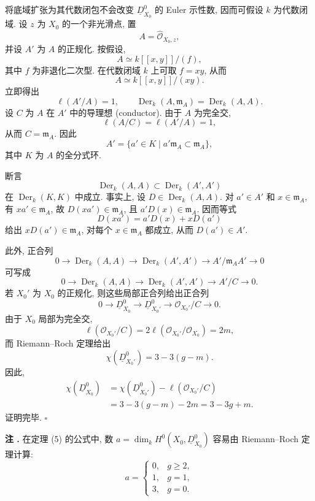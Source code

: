 将底域扩张为其代数闭包不会改变 $\underline D^0_{X_0}$ 的 Euler 示性数, 因而可假设 $k$ 为代数闭域. 设 $z$ 为 $X_0$ 的一个非光滑点, 置
\[
A=\widehat{\mathcal O}_{X_0,z},
\]
并设 $A'$ 为 $A$ 的正规化. 按假设,
\[
A\simeq k[[x,y]]/(f),
\]
其中 $f$ 为非退化二次型. 在代数闭域 $k$ 上可取 $f=xy$, 从而
\[
A\simeq k[[x,y]]/(xy).
\]
立即得出
\[
\ell(A'/A)=1,
\qquad
\operatorname{Der}_k(A,\mathfrak m_A)
=\operatorname{Der}_k(A,A).
\]
设 $C$ 为 $A$ 在 $A'$ 中的导理想 (conductor). 由于 $A$ 为完全交,
\[
\ell(A/C)=\ell(A'/A)=1,
\]
从而 $C=\mathfrak m_A$. 因此
\[
A'=\{a'\in K\mid a'\mathfrak m_A\subset\mathfrak m_A\},
\]
其中 $K$ 为 $A$ 的全分式环.

断言
\[
\operatorname{Der}_k(A,A)
 \subset\operatorname{Der}_k(A',A')
\]
在 $\operatorname{Der}_k(K,K)$ 中成立. 事实上, 设 $D\in\operatorname{Der}_k(A,A)$. 对 $a'\in A'$ 和 $x\in\mathfrak m_A$, 有 $xa'\in\mathfrak m_A$, 故 $D(xa')\in\mathfrak m_A$, 且 $a'D(x)\in\mathfrak m_A$. 因而等式
\[
D(xa')=a'D(x)+xD(a')
\]
给出 $xD(a')\in\mathfrak m_A$, 对每个 $x\in\mathfrak m_A$ 都成立, 从而 $D(a')\in A'$.


此外, 正合列
\[
0\longrightarrow\operatorname{Der}_k(A,A)
 \longrightarrow\operatorname{Der}_k(A',A')
 \longrightarrow A'/\mathfrak m_AA'\longrightarrow0
\]
可写成
\[
0\longrightarrow\operatorname{Der}_k(A,A)
 \longrightarrow\operatorname{Der}_k(A',A')
 \longrightarrow A'/C\longrightarrow0.
\]
若 $X_0'$ 为 $X_0$ 的正规化, 则这些局部正合列给出正合列
\[
0\longrightarrow\underline D^0_{X_0}
 \longrightarrow\underline D^0_{X_0'}
 \longrightarrow\mathcal O_{X_0'}/C\longrightarrow0.
\]
由于 $X_0$ 局部为完全交,
\[
\ell(\mathcal O_{X_0'}/C)
=2\ell(\mathcal O_{X_0'}/\mathcal O_{X_0})=2m,
\]
而 Riemann--Roch 定理给出
\[
\chi(\underline D^0_{X_0'})=3-3(g-m).
\]
因此,
\[
\begin{aligned}
\chi(\underline D^0_{X_0})
&=\chi(\underline D^0_{X_0'})
 -\ell(\mathcal O_{X_0'}/C)\\
&=3-3(g-m)-2m=3-3g+m.
\end{aligned}
\]
证明完毕.
\hfill$\square$

\par\medskip
\noindent\textbf{注 .}
在定理 (5) 的公式中, 数 $a=\dim_kH^0(X_0,\underline D^0_{X_0})$ 容易由 Riemann--Roch 定理计算:
\[
a=
\begin{cases}
0,&g\geq2,\\
1,&g=1,\\
3,&g=0.
\end{cases}
\]

